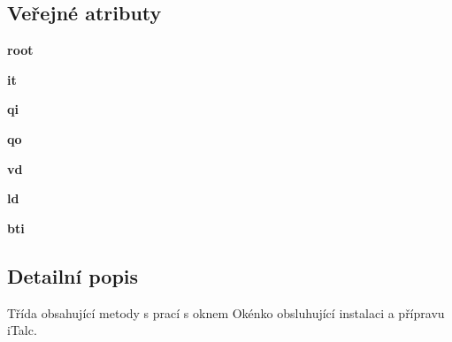 \subsection*{Veřejné atributy}
\begin{DoxyCompactItemize}
\item 
\hypertarget{classitWindow_1_1App_a5117ced114af19bfb2c3bca4e358fecf}{{\bfseries root}}\label{da/dc1/classitWindow_1_1App_a5117ced114af19bfb2c3bca4e358fecf}

\item 
\hypertarget{classitWindow_1_1App_ac6c6184b190927f6585ceeb2ece1ea2b}{{\bfseries it}}\label{da/dc1/classitWindow_1_1App_ac6c6184b190927f6585ceeb2ece1ea2b}

\item 
\hypertarget{classitWindow_1_1App_a07aacdbdffaed3e10d11b8f4c1af3ac7}{{\bfseries qi}}\label{da/dc1/classitWindow_1_1App_a07aacdbdffaed3e10d11b8f4c1af3ac7}

\item 
\hypertarget{classitWindow_1_1App_a75789c9c99805707f63881012a06109d}{{\bfseries qo}}\label{da/dc1/classitWindow_1_1App_a75789c9c99805707f63881012a06109d}

\item 
\hypertarget{classitWindow_1_1App_abe6b33cafc73a90339a592c36e97704c}{{\bfseries vd}}\label{da/dc1/classitWindow_1_1App_abe6b33cafc73a90339a592c36e97704c}

\item 
\hypertarget{classitWindow_1_1App_a6f15bb5d6e708468c0553acee3e6d08e}{{\bfseries ld}}\label{da/dc1/classitWindow_1_1App_a6f15bb5d6e708468c0553acee3e6d08e}

\item 
\hypertarget{classitWindow_1_1App_a88e67d043e457a37416651b04f4cb2dd}{{\bfseries bti}}\label{da/dc1/classitWindow_1_1App_a88e67d043e457a37416651b04f4cb2dd}

\end{DoxyCompactItemize}


\subsection{Detailní popis}
Třída obsahující metody s prací s oknem Okénko obsluhující instalaci a přípravu i\-Talc. 

